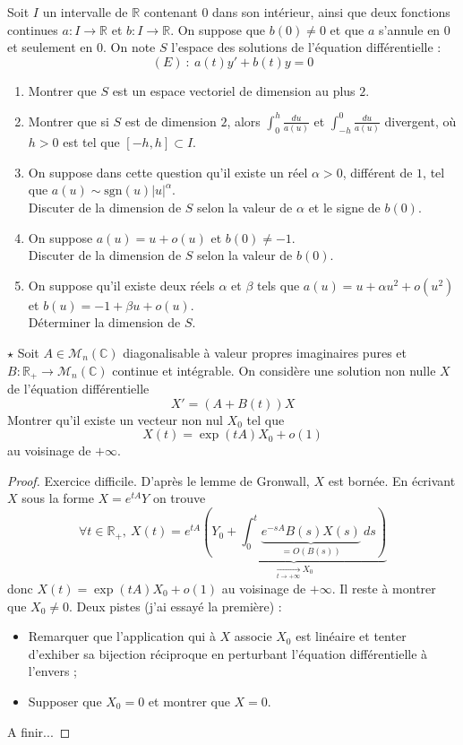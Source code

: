 \documentclass[french,a4paper]{article}
\newcommand{\R}{\mathbb{R}}
\newcommand{\C}{\mathbb{C}}
\theoremstyle{plain}
\theoremstyle{definition}
\theoremstyle{remark}
\begin{document}
\begin{ex}[Moulin.33]{}
	Soit $I$ un intervalle de $\R$ contenant $0$ dans son intérieur, ainsi que deux fonctions continues $a:I\to\R$ et $b:I\to\R$. On suppose que $b(0)\ne0$ et que $a$ s'annule en $0$ et seulement en $0$. On note $S$ l'espace des solutions de l'équation différentielle : $$(E)\ : \ a(t)y'+b(t)y=0$$
	\begin{enumerate}
		\item Montrer que $S$ est un espace vectoriel de dimension au plus $2$.
		\item Montrer que si $S$ est de dimension $2$, alors $\displaystyle\int_{0}^{h}\frac{du}{a(u)}$ et $\displaystyle\int_{-h}^{0}\frac{du}{a(u)}$ divergent, où $h>0$ est tel que $[-h,h]\subset I$.
		\item On suppose dans cette question qu'il existe un réel $\alpha>0$, différent de $1$, tel que $a(u)\sim\text{sgn}(u)\lvert u\rvert^\alpha$. \\
		Discuter de la dimension de $S$ selon la valeur de $\alpha$ et le signe de $b(0)$.
		\item On suppose $a(u)=u+o(u)$ et $b(0)\ne -1$. \\
		Discuter de la dimension de $S$ selon la valeur de $b(0)$.
		\item On suppose qu'il existe deux réels $\alpha$ et $\beta$ tels que $a(u)=u+\alpha u^2+o(u^2)$ et $b(u)=-1+\beta u+o(u)$. \\ Déterminer la dimension de $S$.
	\end{enumerate}
\end{ex}

\begin{ex}[Moulin.34]{$\star$}
	Soit $A\in\mathcal{M}_n(\C)$ diagonalisable à valeur propres imaginaires pures et $B:\R_+\to\mathcal{M}_n(\C)$ continue et intégrable. On considère une solution non nulle $X$ de l'équation différentielle $$X'=(A+B(t))X$$ Montrer qu'il existe un vecteur non nul $X_0$ tel que $$X(t)=\exp(tA)X_0+o(1)$$ au voisinage de $+\infty$.
\end{ex}
\begin{proof}
	Exercice difficile. D'après le lemme de Gronwall, $X$ est bornée. En écrivant $X$ sous la forme $X=e^{tA}Y$ on trouve $$\forall t\in\R_+,\ X(t)=e^{tA}\underbrace{\left(Y_0+\int_{0}^{t}\underbrace{e^{-sA}B(s)X(s)}_{=O(B(s))}\ ds\right)}_{\xrightarrow[t\to+\infty]{}X_0}$$ donc $X(t)=\exp(tA)X_0+o(1)$ au voisinage de $+\infty$. Il reste à montrer que $X_0\ne 0$. Deux pistes (j'ai essayé la première) : 
	\begin{itemize}
		\item Remarquer que l'application qui à $X$ associe $X_0$ est linéaire et tenter d'exhiber sa bijection réciproque en perturbant l'équation différentielle à l'envers ;
		\item Supposer que $X_0=0$ et montrer que $X=0$.
	\end{itemize} A finir...
\end{proof}
\end{document}
